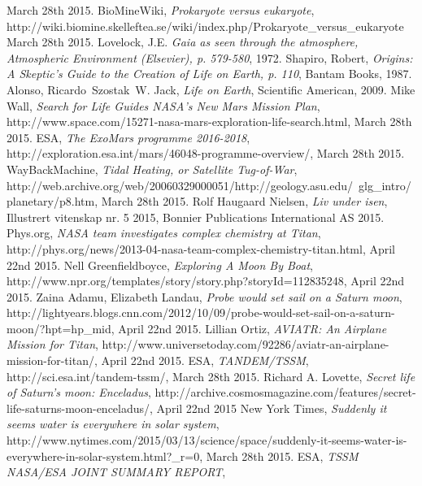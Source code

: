 \begin{thebibliography}{99}
		March 28th 2015.
		 BioMineWiki,
		\emph{Prokaryote versus eukaryote},
		http://wiki.biomine.skelleftea.se/wiki/index.php/Prokaryote\_versus\_eukaryote
		March 28th 2015.
		 Lovelock, J.E.
		\emph{Gaia as seen through the atmosphere, Atmospheric Environment (Elsevier), p. 579-580},
		1972.
		Shapiro, Robert,
		\emph{Origins: A Skeptic's Guide to the Creation of Life on Earth, p. 110},
		Bantam Books,
		1987.
		Alonso, Ricardo\, Szostak\, W. Jack,
		\emph{Life on Earth},
		Scientific American,
		2009.
		Mike Wall,
		\emph{Search for Life Guides NASA's New Mars Mission Plan},
		http://www.space.com/15271-nasa-mars-exploration-life-search.html,
		March 28th 2015.
		ESA,
		\emph{The ExoMars programme 2016-2018},
		http://exploration.esa.int/mars/46048-programme-overview/,
		March 28th 2015.
		WayBackMachine,
		\emph{Tidal Heating, or Satellite Tug-of-War},
		http://web.archive.org/web/20060329000051/http://geology.asu.edu/~glg\_intro/planetary/p8.htm,
		March 28th 2015.
		Rolf Haugaard Nielsen,
		\emph{Liv under isen},
		Illustrert vitenskap nr. 5 2015,
		Bonnier Publications International AS
		2015.
		Phys.org,
		\emph{NASA team investigates complex chemistry at Titan},
		http://phys.org/news/2013-04-nasa-team-complex-chemistry-titan.html,
		April 22nd 2015.
		Nell Greenfieldboyce,
		\emph{Exploring A Moon By Boat},
		http://www.npr.org/templates/story/story.php?storyId=112835248,
		April 22nd 2015.
		Zaina Adamu, Elizabeth Landau,
		\emph{Probe would set sail on a Saturn moon},
		http://lightyears.blogs.cnn.com/2012/10/09/probe-would-set-sail-on-a-saturn-moon/?hpt=hp\_mid,
		April 22nd 2015.
		Lillian Ortiz,
		\emph{AVIATR: An Airplane Mission for Titan},
		http://www.universetoday.com/92286/aviatr-an-airplane-mission-for-titan/,
		April 22nd 2015.
		ESA,
		\emph{TANDEM/TSSM},
		http://sci.esa.int/tandem-tssm/,
		March 28th 2015.
		Richard A. Lovette,
		\emph{Secret life of Saturn’s moon: Enceladus},
		http://archive.cosmosmagazine.com/features/secret-life-saturns-moon-enceladus/,
		April 22nd 2015
		New York Times,
		\emph{Suddenly it seems water is everywhere in solar system},
		http://www.nytimes.com/2015/03/13/science/space/suddenly-it-seems-water-is-everywhere-in-solar-system.html?\_r=0,
		March 28th 2015.
		ESA,
		\emph{TSSM NASA/ESA JOINT SUMMARY REPORT},

\end{thebibliography}
